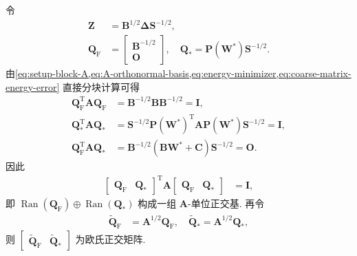 \documentclass{ctexart}
\newcommand{\q}{\quad}
\newcommand{\T}{\mathrm{T}}
\newcommand{\ti}[1]{\widetilde{#1}}
\DeclareMathOperator{\Ran}{Ran}
\begin{document}
令
\begin{align}
    \bm Z&=\bm B^{1/2}\bm\Delta\bm S^{-1/2},
    \label{eq:normalized-error}\\
    \bm Q_{\mathrm{F}}&=\begin{bmatrix}
        \bm B^{-1/2}\\
        \mathbf{O}
    \end{bmatrix},\q
    \bm Q_{\ast}=\bm P(\bm W^{\ast})\bm S^{-1/2}.
    \label{eq:A-orthonormal-basis}
\end{align}
由\cref{eq:setup-block-A,eq:A-orthonormal-basis,eq:energy-minimizer,eq:coarse-matrix-energy-error} 直接分块计算可得
\begin{align}
    \bm Q_{\mathrm F}^\T\bm A\bm Q_{\mathrm F}
    &=\bm B^{-1/2}\bm B\bm B^{-1/2}=\bm I,
    \label{eq:QF-A-QF}\\
    \bm Q_\ast^\T\bm A\bm Q_\ast
    &=\bm S^{-1/2}\bm P(\bm W^\ast)^\T\bm A\bm P(\bm W^\ast)\bm S^{-1/2}=\bm I,
    \label{eq:Qstar-A-Qstar}\\
    \bm Q_{\mathrm F}^\T\bm A\bm Q_\ast
    &=\bm B^{-1/2}(\bm B\bm W^\ast+\bm C)\bm S^{-1/2}=\mathbf O.
    \label{eq:QF-A-Qstar}
\end{align}
因此
\begin{align}
    \begin{bmatrix}\bm Q_{\mathrm F}&\bm Q_\ast\end{bmatrix}^\T
    \bm A
    \begin{bmatrix}\bm Q_{\mathrm F}&\bm Q_\ast\end{bmatrix}
    &=\bm I,
    \label{eq:A-orthonormal-combined}
\end{align}
即 $\Ran(\bm Q_{\mathrm F})\oplus\Ran(\bm Q_\ast)$ 构成一组 $\bm A$-单位正交基. 再令
\begin{align}
    \ti{\bm Q}_{\mathrm{F}}&=\bm A^{1/2}\bm Q_{\mathrm{F}},\q
    \ti{\bm Q}_{\ast}=\bm A^{1/2}\bm Q_{\ast},
    \label{eq:euclidean-orthonormal-basis}
\end{align}
则 $\begin{bmatrix}\ti{\bm Q}_{\mathrm F}&\ti{\bm Q}_\ast\end{bmatrix}$ 为欧氏正交矩阵.
\end{document}
